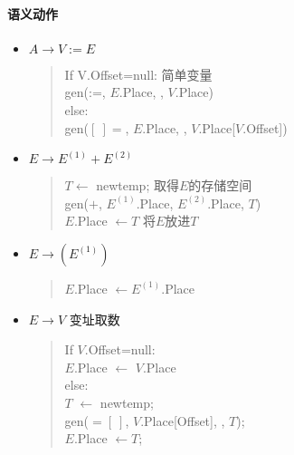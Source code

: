                 \paragraph{语义动作}

                    \begin{itemize}
                        \item $A\to V:=E$
                            \begin{verse}
                                If V.Offset=null: \hfill 简单变量 \\
                                \qquad gen(:=, $E$.Place, \uline\quad, $V$.Place) \\
                                else: \\
                                \qquad gen($[\ ]=$, $E$.Place, \uline\quad, $V$.Place[$V$.Offset])
                            \end{verse}
                        \item $E\to E^{(1)}+E^{(2)}$
                            \begin{verse}
                                $T\gets$ newtemp; \hfill 取得$E$的存储空间 \\
                                gen($+$, $E^{(1)}$.Place, $E^{(2)}$.Place, $T$) \\
                                $E$.Place $\gets T$ \hfill 将$E$放进$T$
                            \end{verse}
                        \item $E\to (E^{(1)})$
                            \begin{verse}
                                $E$.Place $\gets E^{(1)}$.Place
                            \end{verse}
                        \item $E\to V$ \hfill 变址取数
                            \begin{verse}
                                If $V$.Offset=null: \\
                                \qquad $E$.Place $\gets$ $V$.Place \\
                                else: \\
                                \qquad $T$ $\gets$ newtemp; \\
                                \qquad gen($=[\ ]$, $V$.Place[Offset], \uline\quad, $T$); \\
                                \qquad $E$.Place $\gets T$;

\end{verse}
\end{itemize}
